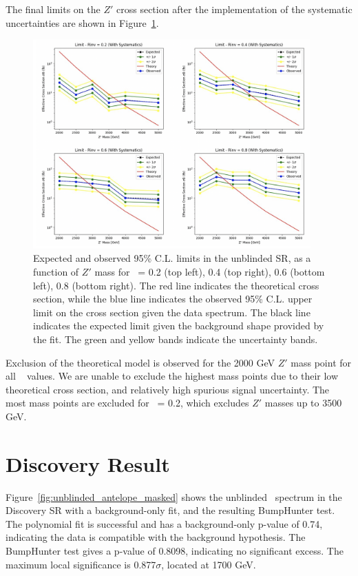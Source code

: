 The final limits on the $Z'$ cross section after the implementation of the systematic uncertainties are shown in Figure~\ref{fig:unblinded_limits_syst}. 
\begin{figure}[!htbp]
\centering
   \includegraphics[width=0.95\textwidth]{figures/results/final_limits}
    \caption{Expected and observed 95\% C.L. limits in the unblinded SR, as a function of $Z'$ mass for \rinv~= 0.2 (top left), 0.4 (top right), 0.6 (bottom left), 0.8 (bottom right). The red line indicates the theoretical cross section, while the blue line indicates the observed 95\% C.L. upper limit on the cross section given the data spectrum. The black line indicates the expected limit given the background shape provided by the fit. The green and yellow bands indicate the uncertainty bands.
    \label{fig:unblinded_limits_syst}}
\end{figure}
Exclusion of the theoretical model is observed for the 2000 GeV $Z'$ mass point for all \rinv~ values.
We are unable to exclude the highest mass points due to their low theoretical cross section, and relatively high spurious signal uncertainty.
The most mass points are excluded for \rinv~= 0.2, which excludes $Z'$ masses up to 3500 GeV.

\clearpage
\section{Discovery Result}
\label{sec:results_svj}
Figure~\ref{fig:unblinded_antelope_masked} shows the unblinded \mt~spectrum in the Discovery SR with a background-only fit, and the resulting BumpHunter test.
The polynomial fit is successful and has a background-only p-value of 0.74, indicating the data is compatible with the background hypothesis. 
The BumpHunter test gives a p-value of 0.8098, indicating no significant excess.
The maximum local significance is 0.877$\sigma$, located at 1700 GeV.

